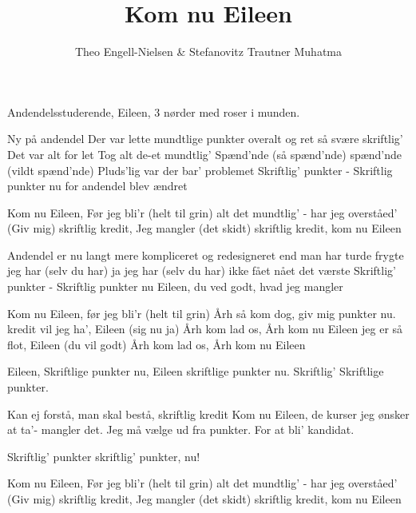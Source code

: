 \documentclass[10pt]{article}
\title{Kom nu Eileen}
\author{Theo Engell-Nielsen \& Stefanovitz Trautner Muhatma}
\begin{document}
\maketitle

\begin{roles}
   Andendelsstuderende, Eileen, 3 nørder
med roser i munden.
\end{roles}

\begin{song}

 Ny på andendel
Der var lette mundtlige punkter overalt og ret så svære skriftlig'
Det var alt for let
Tog alt de-et mundtlig'
Spænd'nde (så spænd'nde) spænd'nde (vildt spænd'nde) 
Pluds'lig var der bar' problemet
Skriftlig' punkter - Skriftlig punkter nu
for andendel blev ændret

Kom nu Eileen, Før jeg bli'r (helt til grin)
alt det mundtlig' - har jeg overståed'
(Giv mig) skriftlig kredit, Jeg mangler (det skidt)
skriftlig kredit, kom nu Eileen


Andendel er nu
langt mere kompliceret og redesigneret end
   man har turde frygte
jeg har (selv du har) ja jeg har (selv du har)
ikke fået nået det værste
Skriftlig' punkter - Skriftlig punkter nu
Eileen, du ved godt, hvad jeg mangler

Kom nu Eileen, før jeg bli'r (helt til grin)
Årh så kom dog, giv mig punkter nu.
kredit vil jeg ha', Eileen (sig nu ja)
Årh kom lad os, Årh kom nu Eileen
jeg er så flot, Eileen (du vil godt)
Årh kom lad os, Årh kom nu Eileen


Eileen, Skriftlige punkter nu, 
Eileen skriftlige punkter nu. Skriftlig' Skriftlige punkter.

          Kan ej forstå, man skal bestå, skriftlig kredit
Kom nu Eileen, de kurser jeg ønsker at ta'- mangler det.
Jeg må vælge ud fra punkter. For at bli' kandidat.

Skriftlig' punkter skriftlig' punkter, nu!


Kom nu Eileen, Før jeg bli'r (helt til grin)
alt det mundtlig' - har jeg overståed'
(Giv mig) skriftlig kredit, Jeg mangler (det skidt)
skriftlig kredit, kom nu Eileen

\end{song}
\end{document}
